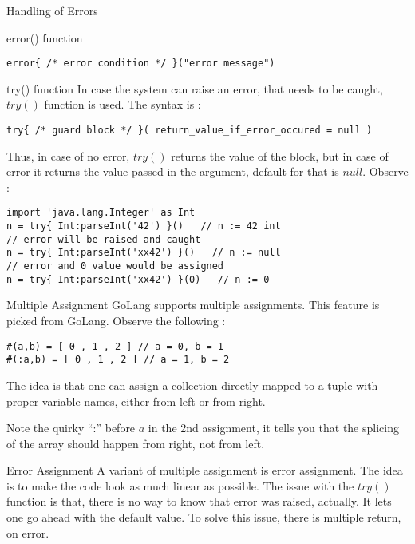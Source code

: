 \begin{section}{Handling of Errors}
\begin{subsection}{error() function}
\begin{lstlisting}[style=JexlStyle]
error{ /* error condition */ }("error message")   
\end{lstlisting}

\end{subsection}

\begin{subsection}{try() function}
In case the system can raise an error, that needs to be caught, 
$try()$ function is used. The syntax is :

\begin{lstlisting}[style=JexlStyle]
try{ /* guard block */ }( return_value_if_error_occured = null )   
\end{lstlisting}
Thus, in case of no error, $try()$ returns the value of the block, but in case 
of error it returns the value passed in the argument, default for that is $null$.
Observe :

\begin{lstlisting}[style=JexlStyle]
import 'java.lang.Integer' as Int 
n = try{ Int:parseInt('42') }()   // n := 42 int 
// error will be raised and caught 
n = try{ Int:parseInt('xx42') }()   // n := null
// error and 0 value would be assigned 
n = try{ Int:parseInt('xx42') }(0)   // n := 0
\end{lstlisting}

\end{subsection}

\begin{subsection}{Multiple Assignment}
GoLang supports multiple assignments. This feature is picked from GoLang.
Observe the following :

\begin{lstlisting}[style=JexlStyle]
#(a,b) = [ 0 , 1 , 2 ] // a = 0, b = 1 
#(:a,b) = [ 0 , 1 , 2 ] // a = 1, b = 2 
\end{lstlisting}

The idea is that one can assign a collection 
directly mapped to a tuple with proper variable names, 
either from left or from right. 

Note the quirky ``:'' before $a$
in the 2nd assignment, it tells you that the splicing of the array
should happen from right, not from left.

\end{subsection}

\begin{subsection}{Error Assignment}
A variant of multiple assignment is error assignment.
The idea is to make the code look as much linear as possible.
The issue with the $try()$ function is that, there is no way to know
that error was raised, actually. It lets one go ahead with the default value.
To solve this issue, there is multiple return, on error.


\end{subsection}
\end{section}
